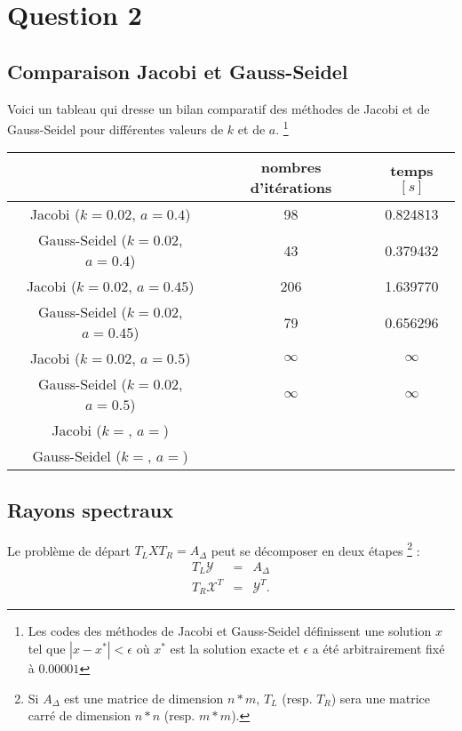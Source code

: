 \section{Question 2}
\subsection{Comparaison Jacobi et Gauss-Seidel}
Voici un tableau qui dresse un bilan comparatif des méthodes de Jacobi et de Gauss-Seidel pour différentes valeurs de $k$ et de $a$. \footnote{Les codes des méthodes de Jacobi et Gauss-Seidel définissent une solution $x$ tel que $|x-x^*|<\epsilon$ où $x^*$ est la solution exacte et $\epsilon$ a été arbitrairement fixé à $0.00001$}

\begin{tabular}{|c|c|c|}
\hline
& nombres d'itérations & temps $[s]$\\
\hline
Jacobi ($k=0.02$, $a=0.4$) &98 &  0.824813\\
Gauss-Seidel ($k=0.02$, $a=0.4$) &43 & 0.379432 \\
\hline
Jacobi ($k=0.02$, $a=0.45$) &206 & 1.639770\\
Gauss-Seidel ($k=0.02$, $a=0.45$) & 79 & 0.656296 \\
\hline
Jacobi ($k=0.02$, $a=0.5$) & $\infty$ & $\infty$\\
Gauss-Seidel ($k=0.02$, $a=0.5$) & $\infty$ & $\infty$\\
\hline
Jacobi ($k=$, $a=$) & & \\
Gauss-Seidel ($k=$, $a=$) & & \\
\hline
\end{tabular}

\subsection{Rayons spectraux}
Le problème de départ $T_L X T_R = A_{\Delta}$ peut se décomposer en deux étapes \footnote{Si $A_{\Delta}$ est une matrice de dimension $n*m$, $T_L$ (resp. $T_R$) sera une  matrice carré de dimension $n*n$ (resp. $m*m$).} : 
\begin{eqnarray}\label{eq_q2}
T_L \mathcal{Y} &=& A_{\Delta}\\
T_R \mathcal{X}^T &=& \mathcal{Y}^T.
\end{eqnarray}

